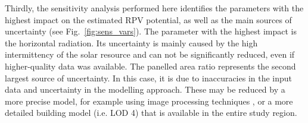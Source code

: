 Thirdly, the sensitivity analysis performed here identifies the parameters with the highest impact on the estimated RPV potential, as well as the main sources of uncertainty (see Fig.~\ref{fig:sens_vars}). The parameter with the highest impact is the horizontal radiation. Its uncertainty is mainly caused by the high intermittency of the solar resource and can not be significantly reduced, even if higher-quality data was available. 
The panelled area ratio represents the second largest source of uncertainty. In this case, it is due to inaccuracies in the input data and uncertainty in the modelling approach. These may be reduced by a more precise model, for example using image processing techniques \cite{mainzer_assessment_2017}, or a more detailed building model (i.e. LOD 4) that is available in the entire study region.

